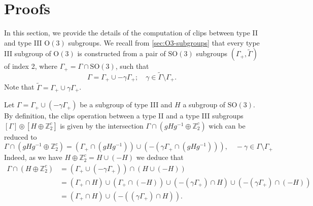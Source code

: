 \documentclass[11pt,a4paper]{amsart}
\theoremstyle{definition}
\newcommand{\ZZ}{\mathbb{Z}}                %
\newcommand{\OO}{\mathrm{O}}                %
\newcommand{\SO}{\mathrm{SO}}               %
\newcommand{\1}{\mathds{1}}		            %
\begin{document}
\section{Proofs}
\label{sec:proof_clips}

In this section, we provide the details of the computation of clips between type II and type III $\OO(3)$ subgroups. We recall from \autoref{sec:O3-subgroups} that every type III subgroup of $\OO(3)$ is constructed from a pair of $\SO(3)$ subgroups $(\Gamma_+,\tilde{\Gamma})$ of index 2, where $\Gamma_+=\Gamma\cap\SO(3)$, such that 
	\begin{equation*}
	\Gamma=\Gamma_+\cup -\gamma \Gamma_+;\quad \gamma\in \tilde{\Gamma}\setminus \Gamma_+.
	\end{equation*}
	Note that $\tilde{\Gamma}=\Gamma_+\cup \gamma\Gamma_+$.


Let $\Gamma=\Gamma_+\cup (-\gamma \Gamma_+)$ be a subgroup of type III and $H$ a subgroup of $\SO(3)$.
By definition, the clips operation between a type II and a type III subgroups $[\Gamma] \circledcirc [H\oplus \ZZ_2^c]$ is given by the intersection $\Gamma\cap (g H g^{-1}\oplus \ZZ_2^c)$ wich can be reduced to 
\begin{equation}\label{eq:Inter_Type_I_et_III}
	\Gamma\cap (g H g^{-1}\oplus \ZZ_2^c)=(
	\Gamma_+\cap (gHg^{-1}))\cup (-(\gamma \Gamma_+\cap (gHg^{-1}))),\quad -\gamma\in \Gamma \setminus \Gamma_+
\end{equation}
Indeed, as we have $H\oplus \ZZ_2^c=H\cup (-H)$ we deduce that
		\begin{align*}
		\Gamma\cap (H\oplus \ZZ_2^c) & =(\Gamma_+\cup(-\gamma \Gamma_+))\cap(H\cup (-H))                                                        \\
		& =(\Gamma_+\cap H)\cup (\Gamma_+\cap(-H))\cup (-(\gamma \Gamma_+)\cap H)\cup (-(\gamma \Gamma_+)\cap(-H)) \\
		& =(\Gamma_+\cap H)\cup (-((\gamma \Gamma_+)\cap H)).
		\end{align*}
\end{document}
